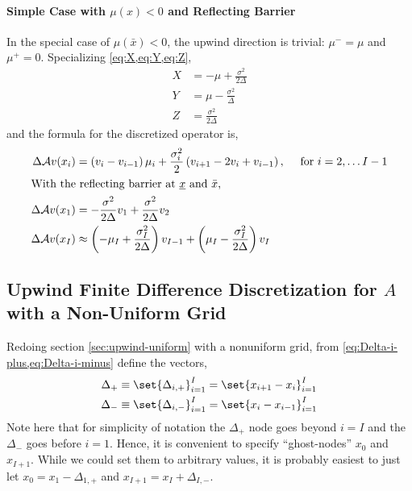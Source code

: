\documentclass[11pt]{etk-article}
\begin{document}
\paragraph{Simple Case with $\mu(x) < 0$ and Reflecting Barrier}
In the special case of $\mu(\bar{x}) < 0$, the upwind direction is trivial: $\mu^{-} = \mu$ and $\mu^{+} = 0$.  Specializing \cref{eq:X,eq:Y,eq:Z},
\begin{align}
	X &= - \mu+ \frac{\sigma^{2}}{2 \Delta}\label{eq:X-backwards} \\
	Y &= \mu - \frac{\sigma^{2}}{\Delta}\label{eq:Y-backwards} \\
	Z &= \frac{\sigma^{2}}{2 \Delta}\label{eq:Z-backwards}
\end{align}
and the formula for the discretized operator is,
\begin{align}
	\Delta \mathcal{A} v(x_i)  &= \left(v_i-v_{i-1}\right)\mu_i + \frac{\sigma_i^2}{2} \left(v_{i+1} - 2 v_i + v_{i-1}\right),\quad \text{ for } i = 2,\ldots I-1\\
	\intertext{With the reflecting barrier at $\underline{x}$ and $\bar{x}$,}
	\Delta \mathcal{A} v(x_1) &= -\frac{\sigma^{2}}{2\Delta}v_1 + \frac{\sigma^{2}}{2\Delta} v_2\\
\Delta \mathcal{A} v(x_I)&\approx \left(-\mu_I +\frac{\sigma_I^2}{2\Delta}\right) v_{I-1} + \left(\mu_I - \frac{\sigma_I^2}{2\Delta}\right) v_I 
\end{align}

\subsection{Upwind Finite Difference Discretization for $A$ with a Non-Uniform Grid}\label{sec:upwind-non-uniform}
Redoing section \cref{sec:upwind-uniform} with a nonuniform grid, from \cref{eq:Delta-i-plus,eq:Delta-i-minus} define the vectors,
 \begin{align}
\Delta_{+}&\equiv \set{\Delta_{i,+}}_{i=1}^I = \set{x_{i+1} - x_i}_{i=1}^{I}\label{eq:Delta-plus}\\
\Delta_{-}&\equiv \set{\Delta_{i,-}}_{i=1}^I = \set{x_i - x_{i-1}}_{i=1}^I\label{eq:Delta-minus}	
\end{align}
Note here that for simplicity of notation the $\Delta_{+}$ node goes beyond $i=I$ and the $\Delta_{-}$ goes before $i=1$.  Hence, it is convenient to specify ``ghost-nodes'' $x_0$ and $x_{I+1}$.  While we could set them to arbitrary values, it is probably easiest to just let $x_0 = x_1 - \Delta_{1,+}$ and $x_{I+1} = x_I + \Delta_{I,-}$.
\end{document}
